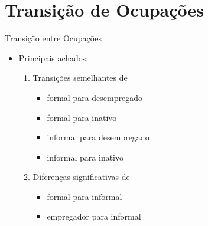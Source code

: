 \documentclass[11pt]{beamer}
\begin{document}

%

\section{Transição de Ocupações}

\begin{frame}

\centering
{\huge Transição entre Ocupações}

\vspace{4mm}
\begin{itemize}
	\item{Principais achados:
	\vspace{3mm}
	\begin{enumerate}

		\item{Transições semelhantes de 
		\begin{itemize}
			\item{formal para desempregado}
			\item{formal para inativo}
			\item{informal para desempregado}
			\item{informal para inativo}
		\end{itemize}
		}
		\vspace{2mm}
		\item{Diferenças significativas de
		\begin{itemize}
			\item{formal para informal}
			\item{empregador para informal}
		\end{itemize}
		}
	\end{enumerate}
	}
\end{itemize}

\end{frame}
\end{document}
